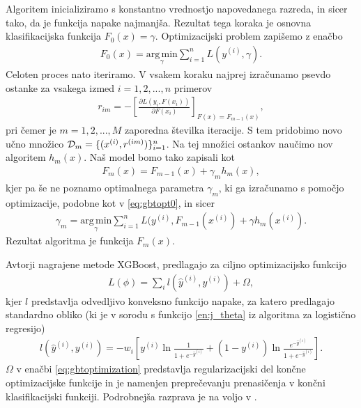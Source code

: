 \documentclass[11pt,a4paper,openany]{book}
\begin{document}
Algoritem inicializiramo s konstantno vrednostjo napovedanega razreda, in sicer tako, da je funkcija napake najmanjša. Rezultat tega koraka je osnovna klasifikacijska funkcija $F_0(x) = \gamma$. Optimizacijski problem zapišemo z enačbo
\begin{eqnarray}
	F_0(x) = \underset{\gamma}{\mathrm{arg\,min}} \sum_{i=1}^n L(y^{(i)}, \gamma).
	\label{eq:gbtopt0}
\end{eqnarray}
Celoten proces nato iteriramo. V vsakem koraku najprej izračunamo psevdo ostanke za vsakega izmed $i = 1, 2, ..., n$ primerov
\begin{eqnarray}
	r_{im} = -\left[
		\frac{\partial L(y_i, F(x_i))}{\partial F(x_i)}
	\right]_{F(x)=F_{m-1}(x)},
\end{eqnarray}
pri čemer je $m = 1, 2, ..., M$ zaporedna številka iteracije. S tem pridobimo novo učno množico ${\cal D}_m = \{(x^{(i)}, r^{(im)})\}_{i=1}^n$. Na tej množici ostankov naučimo nov algoritem $h_m(x)$. Naš model bomo tako zapisali kot
\begin{eqnarray}
	F_m(x) = F_{m-1}(x) + \gamma_m h_m(x),
\end{eqnarray}
kjer pa še ne poznamo optimalnega parametra $\gamma_m$, ki ga izračunamo s pomočjo optimizacije, podobne kot v \ref{eq:gbtopt0}, in sicer
\begin{eqnarray}
	\gamma_m = \underset{\gamma}{\mathrm{arg\,min}} \sum_{i=1}^n L(y^{(i)}, F_{m-1}(x^{(i)}) + \gamma h_m(x^{(i)}).
\end{eqnarray}
Rezultat algoritma je funkcija $F_m(x)$.

Avtorji nagrajene metode XGBoost\cite{chen2014}, \cite{chenG16} predlagajo za ciljno optimizacijsko funkcijo 
\begin{eqnarray}
	L(\phi) = \sum_i l(\hat{y}^{(i)}, y^{(i)}) + \Omega,
	\label{eq:gbtoptimization}
\end{eqnarray}
kjer $l$ predstavlja odvedljivo konveksno funkcijo napake, za katero predlagajo standardno obliko (ki je v sorodu s funkcijo \ref{en:j_theta} iz algoritma za logistično regresijo)
\begin{eqnarray}
	l(\hat{y}^{(i)}, y^{(i)}) = -w_i\left[
		y^{(i)} \ln \frac{1}{1 + e^{-\hat{y}^{(i)}}} +
		(1 - y^{(i)}) \ln \frac{e^{-\hat{y}^{(i)}}}{1 + e^{-\hat{y}^{(i)}}}
	\right].
\end{eqnarray}
$\Omega$ v enačbi \ref{eq:gbtoptimization} predstavlja regularizacijski del končne optimizacijske funkcije in je namenjen preprečevanju prenasičenja v končni klasifikacijski funkciji. Podrobnejša razprava je na voljo v \cite{chen2014}.
\end{document}
